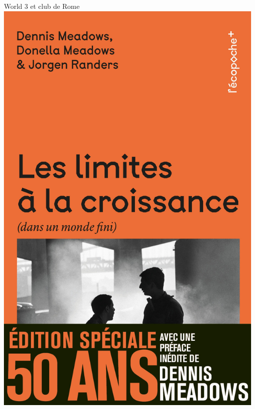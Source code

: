 \documentclass{beamer}
\begin{document}
\begin{frame}{World 3 et club de Rome}
\includegraphics[scale=0.04]{images/limites_croissance.jpg}
\end{frame}
\end{document}
